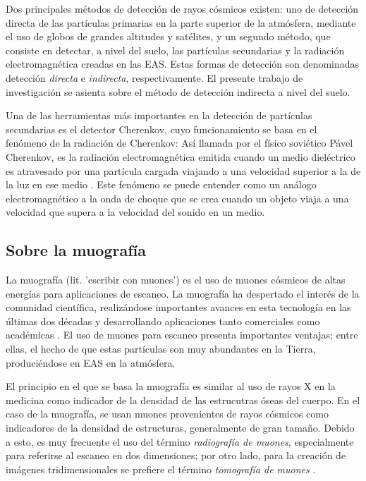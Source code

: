 \documentclass[12pt]{report}
\begin{document}
Dos principales métodos de detección de rayos cósmicos existen: uno de detección directa de las partículas primarias en la parte superior de la atmósfera, mediante el uso de globos de grandes altitudes y satélites, y un segundo método, que consiste en detectar, a nivel del suelo, las partículas secundarias y la radiación electromagnética creadas en las EAS. Estas formas de detección son denominadas detección \textit{directa} e \textit{indirecta}, respectivamente. El presente trabajo de investigación se asienta sobre el método de detección indirecta a nivel del suelo.

Una de las herramientas más importantes en la detección de partículas secundarias es el detector Cherenkov, cuyo funcionamiento se basa en el fenómeno de la radiación de Cherenkov: Así llamada por el físico soviético Pável Cherenkov, es la radiación electromagnética emitida cuando un medio dieléctrico es atravesado por una partícula cargada viajando a una velocidad superior a la de la luz en ese medio \cite{jelley1955cerenkov}. Este fenómeno se puede entender como un análogo electromagnético a la onda de choque que se crea cuando un objeto viaja a una velocidad que supera a la velocidad del sonido en un medio.



\subsection*{Sobre la muografía}

La muografía (lit. 'escribir con muones') es el uso de muones cósmicos de altas energías para aplicaciones de escaneo. La muografía ha despertado el interés de la comunidad científica, realizándose importantes avances en esta tecnología en las últimas dos décadas y desarrollando aplicaciones tanto comerciales como académicas \cite{kaiser2019muography}. El uso de muones para escaneo presenta importantes ventajas; entre ellas, el hecho de que estas partículas son muy abundantes en la Tierra, produciéndose en EAS en la atmósfera.

El principio en el que se basa la muografía es similar al uso de rayos X en la medicina como indicador de la densidad de las estrucutras óseas del cuerpo. En el caso de la muografía, se usan muones provenientes de rayos cósmicos como indicadores de la densidad de estructuras, generalmente de gran tamaño. Debido a esto, es muy frecuente el uso del término \textit{radiografía de muones}, especialmente para referirse al escaneo en dos dimensiones; por otro lado, para la creación de imágenes tridimensionales se prefiere el término \textit{tomografía de muones} \cite{kaiser2019muography}.
\end{document}
